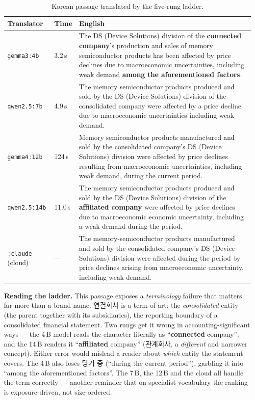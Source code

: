 \documentclass[11pt,a4paper]{report}
\newcommand{\cncjk}[2]{{\cjkCNfont #1}}
\begin{document}
\begin{table}[h]
\small
\caption{Korean passage translated by the five-rung ladder.}
\label{tab:ladder-korea}
\begin{tabular}{@{}l l p{}@{}}
\toprule
\textbf{Translator} & \textbf{Time} & \textbf{English} \\
\midrule
\texttt{gemma3:4b} & 3.2\,s & The DS (Device Solutions) division of the \textbf{connected company}'s production and sales of memory semiconductor products has been affected by price declines due to macroeconomic uncertainties, including weak demand \textbf{among the aforementioned factors}. \\
\addlinespace
\texttt{qwen2.5:7b} & 4.9\,s & The memory semiconductor products produced and sold by the DS (Device Solutions) division of the consolidated company were affected by a price decline due to macroeconomic uncertainties including weak demand. \\
\addlinespace
\texttt{gemma4:12b} & 124\,s & Memory semiconductor products manufactured and sold by the consolidated company's DS (Device Solutions) division were affected by price declines resulting from macroeconomic uncertainties, including weak demand, during the current period. \\
\addlinespace
\texttt{qwen2.5:14b} & 11.0\,s & The memory semiconductor products produced and sold by the DS (Device Solutions) division of the \textbf{affiliated company} were affected by price declines due to macroeconomic economic uncertainty, including a weak demand during the period. \\
\addlinespace
\texttt{:claude} (cloud) & --- & The memory-semiconductor products manufactured and sold by the consolidated company's DS (Device Solutions) division were affected during the period by price declines arising from macroeconomic uncertainty, including weak demand. \\
\bottomrule
\end{tabular}
\end{table}

\noindent \textbf{Reading the ladder.} This passage exposes a \emph{terminology} failure that matters far more
than a brand name. \cncjk{연결회사}{} is a term of art: the \emph{consolidated} entity (the parent together
with its subsidiaries), the reporting boundary of a consolidated financial statement. Two rungs get it wrong
in accounting-significant ways --- the 4\,B model reads the character literally as ``\textbf{connected}
company'', and the 14\,B renders it ``\textbf{affiliated} company'' (\cncjk{관계회사}{}, a \emph{different} and
narrower concept). Either error would mislead a reader about \emph{which} entity the statement covers. The
4\,B also loses \cncjk{당기 중}{} (``during the current period''), garbling it into ``among the aforementioned
factors''. The 7\,B, the 12\,B and the cloud all handle the term correctly --- another reminder that on
specialist vocabulary the ranking is exposure-driven, not size-ordered.
\end{document}
